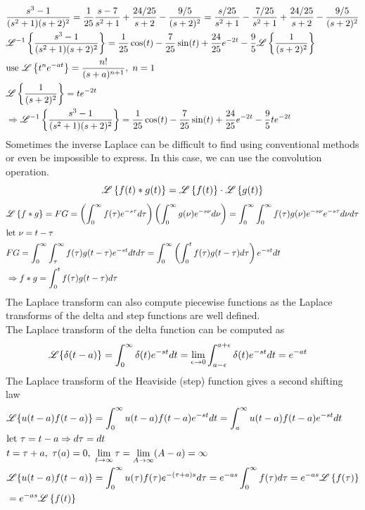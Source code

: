 \documentclass[11pt, fleqn]{article}
\begin{document}
\begin{align*}
    &\frac{s^3-1}{(s^2+1)(s+2)^2}=\frac{1}{25}\frac{s-7}{s^2+1}+\frac{24/25}{s+2}-\frac{9/5}{(s+2)^2}=\frac{s/25}{s^2+1}-\frac{7/25}{s^2+1}+\frac{24/25}{s+2}-\frac{9/5}{(s+2)^2}\\
    &\lap^{-1}\brcurly{\frac{s^3-1}{(s^2+1)(s+2)^2}}=\frac{1}{25}\cos(t)-\frac{7}{25}\sin(t)+\frac{24}{25}e^{-2t}-\frac{9}{5}\lap\brcurly{\frac{1}{(s+2)^2}}\\
    &\text{use }\lap\brcurly{t^ne^{-at}}=\frac{n!}{(s+a)^{n+1}},\ n=1\\
    &\lap\brcurly{\frac{1}{(s+2)^2}}=te^{-2t}\\
    &\Ra \lap^{-1}\brcurly{\frac{s^3-1}{(s^2+1)(s+2)^2}}=\frac{1}{25}\cos(t)-\frac{7}{25}\sin(t)+\frac{24}{25}e^{-2t}-\frac{9}{5}te^{-2t}
\end{align*}
Sometimes the inverse Laplace can be difficult to find using conventional methods or even be impossible to express. In this case, we can use the convolution operation.\\
$$\mathscr{L}\left\{ f(t)*g(t) \right\}=\mathscr{L}\left\{ f(t) \right\}\cdot\mathscr{L}\left\{ g(t) \right\}$$
\begin{align*}
    &\mathscr{L}\left\{ f*g \right\}=FG=\left( \int_0^\infty f(\tau)e^{-s\tau}d\tau \right)\left( \int_0^\infty g(\nu)e^{-s\nu}d\nu \right)=\int_0^\infty\int_0^\infty f(\tau)g(\nu)e^{-s\nu}e^{-s\tau}d\nu d\tau\\
    &\text{let }\nu=t-\tau\\
    &FG=\int_0^\infty\int_\tau^\infty f(\tau) g(t-\tau)e^{-st}dtd\tau=\int_0^\infty\left( \int_0^t f(\tau) g(t-\tau)d\tau \right)e^{-st}dt\\
    &\Rightarrow f*g=\int_0^t f(\tau)g(t-\tau)d\tau
\end{align*}
The Laplace transform can also compute piecewise functions as the Laplace transforms of the delta and step functions are well defined.\\
The Laplace transform of the delta function can be computed as
\begin{align*}
    &\mathscr{L}\{\delta(t-a)\}=\int_0^\infty\delta(t)e^{-st}dt=\lim_{\epsilon\to0}\int_{a-\epsilon}^{a+\epsilon}\delta(t)e^{-st}dt=e^{-at}
\end{align*}
The Laplace transform of the Heaviside (step) function gives a second shifting law
\begin{align*}
    &\lap\{u(t-a)f(t-a)\}=\int_0^\infty u(t-a)f(t-a)e^{-st}dt=\int_a^\infty u(t-a)f(t-a)e^{-st}dt\\
    &\text{let }\tau=t-a\Ra d\tau=dt\\
    &t=\tau+a,\ \tau(a)=0,\ \lim_{t\to\infty}\tau=\lim_{A\to\infty}(A-a)=\infty\\
    &\lap\{u(t-a)f(t-a)\}=\int_0^\infty u(\tau)f(\tau)e^{-(\tau+a)s}d\tau=e^{-as}\int_0^\infty f(\tau)d\tau=e^{-as}\lap\brcurly{f(\tau)}\\
    &=e^{-as}\lap\brcurly{f(t)}
\end{align*}
\end{document}
